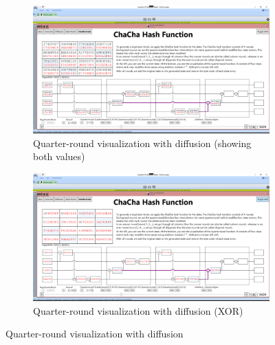 \begin{figure}
\begin{subfigure}[t]{\textwidth}
  \centering
  \includegraphics[width=\textwidth]{figures/ct2/chachahash/chachahash-mid-qr-diffusion.png}
  \caption{Quarter-round visualization with diffusion (showing both values)}
  \label{fig:chachahash.mid.qr.with.diffusion}
\end{subfigure}
\begin{subfigure}[t]{\textwidth}
  \centering
  \includegraphics[width=\textwidth]{figures/ct2/chachahash/chachahash-mid-qr-diffusion-xor.png}
  \caption{Quarter-round visualization with diffusion (XOR)}
\label{fig:chachahash.md.qr.with.diffusion.xor}
\end{subfigure}
\caption{Quarter-round visualization with diffusion}
\label{fig:chachahash.mid.qr}
\end{figure}

